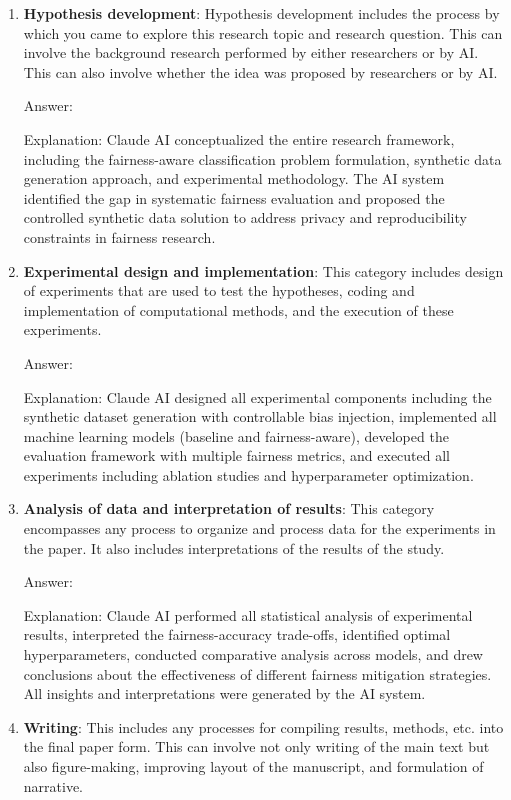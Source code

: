 \documentclass{article}
\begin{document}
\begin{enumerate}
    \item \textbf{Hypothesis development}: Hypothesis development includes the process by which you came to explore this research topic and research question. This can involve the background research performed by either researchers or by AI. This can also involve whether the idea was proposed by researchers or by AI.

    Answer: \involvementD{}

    Explanation: Claude AI conceptualized the entire research framework, including the fairness-aware classification problem formulation, synthetic data generation approach, and experimental methodology. The AI system identified the gap in systematic fairness evaluation and proposed the controlled synthetic data solution to address privacy and reproducibility constraints in fairness research.

    \item \textbf{Experimental design and implementation}: This category includes design of experiments that are used to test the hypotheses, coding and implementation of computational methods, and the execution of these experiments.

    Answer: \involvementD{}

    Explanation: Claude AI designed all experimental components including the synthetic dataset generation with controllable bias injection, implemented all machine learning models (baseline and fairness-aware), developed the evaluation framework with multiple fairness metrics, and executed all experiments including ablation studies and hyperparameter optimization.

    \item \textbf{Analysis of data and interpretation of results}: This category encompasses any process to organize and process data for the experiments in the paper. It also includes interpretations of the results of the study.

    Answer: \involvementD{}

    Explanation: Claude AI performed all statistical analysis of experimental results, interpreted the fairness-accuracy trade-offs, identified optimal hyperparameters, conducted comparative analysis across models, and drew conclusions about the effectiveness of different fairness mitigation strategies. All insights and interpretations were generated by the AI system.

    \item \textbf{Writing}: This includes any processes for compiling results, methods, etc. into the final paper form. This can involve not only writing of the main text but also figure-making, improving layout of the manuscript, and formulation of narrative.


\end{enumerate}
\end{document}
